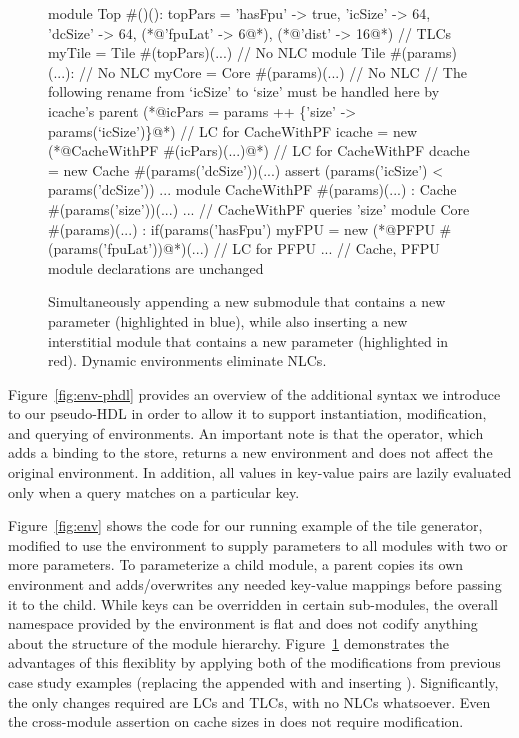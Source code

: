 \begin{figure}
\centering
\begin{phdl}
module Top #()():
  topPars = {'hasFpu' -> true, 'icSize' -> 64, 'dcSize' -> 64, (*@\textcolor[rgb]{0,0,1}{'fpuLat' -> 6}@*), (*@\textcolor[rgb]{1,0,0}{'dist' -> 16}@*) } // TLCs
  myTile = Tile #(topPars)(...)                                  // No NLC
module Tile #(params)(...):                                      // No NLC
  myCore = Core #(params)(...)                                   // No NLC
  // The following rename from `icSize' to `size' must be handled here by icache's parent
  (*@\textcolor[rgb]{1,0,0}{icPars = params ++ \{'size' -> params(`icSize')\}}@*)                // LC for CacheWithPF
  icache = new (*@\textcolor[rgb]{1,0,0}{CacheWithPF \#(icPars)(...)}@*)                        // LC for CacheWithPF
  dcache = new Cache #(params('dcSize'))(...)
  assert (params('icSize') < params('dcSize')) ...
module CacheWithPF #(params)(...) :
  Cache #(params('size'))(...) ... // CacheWithPF queries 'size'
module Core #(params)(...) :
   if(params('hasFpu') myFPU = new (*@\textcolor[rgb]{0,0,1}{PFPU \#(params('fpuLat'))}@*)(...) // LC for PFPU
... // Cache, PFPU module declarations are unchanged
\end{phdl} 
\caption[Modifying the example with dynamic environments.]{
Simultaneously appending a new submodule that contains a new parameter (highlighted in blue), while also inserting
a new interstitial module that contains a new parameter (highlighted in red). Dynamic environments eliminate NLCs.}
\label{fig:env-delta}
\end{figure}
Figure~\ref{fig:env-phdl} provides an overview of the additional syntax we introduce to our pseudo-HDL in order to allow it to support instantiation, modification, and querying of environments.
An important note is that the \code{++} operator, which adds a binding to the store, returns a new environment and does not affect the original environment.
In addition, all values in key-value pairs are lazily evaluated only when a query matches on a particular key.

Figure~\ref{fig:env} shows the code for our running example of the tile generator, modified to use the environment to supply parameters to all modules with two or more parameters.
To parameterize a child module, a parent copies its own environment and adds/overwrites any needed key-value mappings before passing it to the child.
While keys can be overridden in certain sub-modules, the overall namespace provided by the environment is flat and does not codify anything about the structure of the module hierarchy.
Figure~\ref{fig:env-delta} demonstrates the advantages of this flexiblity by applying both of the modifications from previous case study examples
(replacing the appended  with  and inserting ).
Significantly, the only changes required are LCs and TLCs, with no NLCs whatsoever.
Even the cross-module assertion on cache sizes in  does not require modification.

